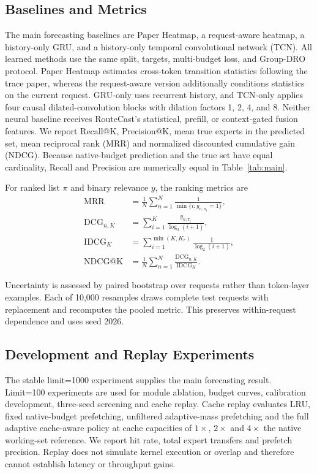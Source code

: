 \documentclass[conference]{IEEEtran}
\begin{document}
\subsection{Baselines and Metrics}
The main forecasting baselines are Paper Heatmap, a request-aware heatmap, a history-only GRU, and a history-only temporal convolutional network (TCN). All learned methods use the same split, targets, multi-budget loss, and Group-DRO protocol. Paper Heatmap estimates cross-token transition statistics following the trace paper, whereas the request-aware version additionally conditions statistics on the current request. GRU-only uses recurrent history, and TCN-only applies four causal dilated-convolution blocks with dilation factors 1, 2, 4, and 8. Neither neural baseline receives RouteCast's statistical, prefill, or context-gated fusion features. We report Recall@K, Precision@K, mean true experts in the predicted set, mean reciprocal rank (MRR) and normalized discounted cumulative gain (NDCG). Because native-budget prediction and the true set have equal cardinality, Recall and Precision are numerically equal in Table~\ref{tab:main}.

For ranked list $\pi$ and binary relevance $y$, the ranking metrics are
\begin{align}
\mathrm{MRR}&=\frac{1}{N}\sum_{n=1}^{N}
\frac{1}{\min\{i:y_{n,\pi_i}=1\}},\\
\mathrm{DCG}_{n,K}&=\sum_{i=1}^{K}
\frac{y_{n,\pi_i}}{\log_2(i+1)},\\
\mathrm{IDCG}_{K}&=\sum_{i=1}^{\min(K,K_r)}
\frac{1}{\log_2(i+1)},\\
\mathrm{NDCG@K}&=\frac{1}{N}\sum_{n=1}^{N}
\frac{\mathrm{DCG}_{n,K}}{\mathrm{IDCG}_{K}}.
\label{eq:ranking-metrics}
\end{align}

Uncertainty is assessed by paired bootstrap over requests rather than token-layer examples. Each of 10,000 resamples draws complete test requests with replacement and recomputes the pooled metric. This preserves within-request dependence and uses seed 2026.

\subsection{Development and Replay Experiments}
The stable limit=1000 experiment supplies the main forecasting result. Limit=100 experiments are used for module ablation, budget curves, calibration development, three-seed screening and cache replay. Cache replay evaluates LRU, fixed native-budget prefetching, unfiltered adaptive-mass prefetching and the full adaptive cache-aware policy at cache capacities of $1\times$, $2\times$ and $4\times$ the native working-set reference. We report hit rate, total expert transfers and prefetch precision. Replay does not simulate kernel execution or overlap and therefore cannot establish latency or throughput gains.
\end{document}
